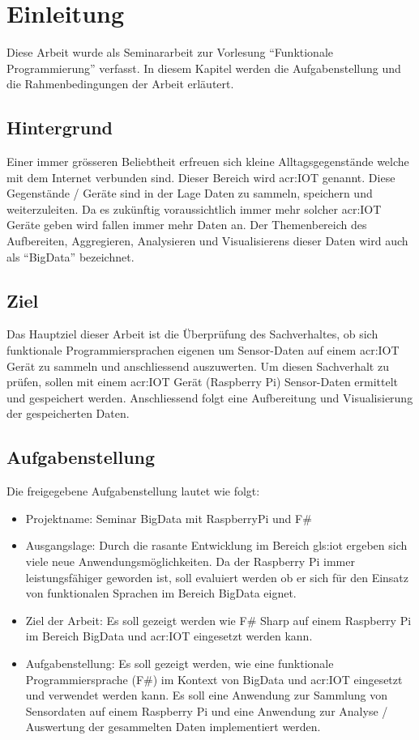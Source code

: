 
\chapter{Einleitung}
Diese Arbeit wurde als Seminararbeit zur Vorlesung "`Funktionale Programmierung"' verfasst.
In diesem Kapitel werden die Aufgabenstellung und die Rahmenbedingungen der Arbeit erläutert.


\section{Hintergrund}
Einer immer grösseren Beliebtheit erfreuen sich kleine Alltagsgegenstände welche mit dem Internet verbunden sind. Dieser Bereich wird \gls{acr:IOT} genannt. Diese Gegenstände / Geräte sind in der Lage Daten zu sammeln, speichern und weiterzuleiten. Da es zukünftig voraussichtlich immer mehr solcher \gls{acr:IOT} Geräte geben wird fallen immer mehr Daten an. Der Themenbereich des Aufbereiten, Aggregieren, Analysieren und Visualisierens dieser Daten wird auch als "`BigData"' bezeichnet.


\section{Ziel}
Das Hauptziel dieser Arbeit ist die Überprüfung des Sachverhaltes, ob sich funktionale Programmiersprachen eigenen um Sensor-Daten auf einem \gls{acr:IOT} Gerät zu sammeln und anschliessend auszuwerten. Um diesen Sachverhalt zu prüfen, sollen mit einem \gls{acr:IOT} Gerät (Raspberry Pi) Sensor-Daten ermittelt und gespeichert werden. Anschliessend folgt eine Aufbereitung und Visualisierung der gespeicherten Daten.

\section{Aufgabenstellung} \label{sec:Aufgabenstellung}
Die freigegebene Aufgabenstellung lautet wie folgt:

\begin{itemize}
\item Projektname: Seminar BigData mit RaspberryPi und F\#
\item Ausgangslage: Durch die rasante Entwicklung im Bereich \Gls{gls:iot} ergeben sich viele neue Anwendungsmöglichkeiten. Da der Raspberry Pi immer leistungsfähiger geworden ist, soll evaluiert werden ob er sich für den Einsatz von funktionalen Sprachen im Bereich BigData eignet.
\item Ziel der Arbeit: Es soll gezeigt werden wie F\# Sharp auf einem Raspberry Pi im Bereich BigData und \gls{acr:IOT} eingesetzt werden kann.
\item Aufgabenstellung: Es soll gezeigt werden, wie eine funktionale Programmiersprache (F\#) im Kontext von BigData und \gls{acr:IOT} eingesetzt und verwendet werden kann. Es soll eine Anwendung zur Sammlung von Sensordaten auf einem Raspberry Pi und eine Anwendung zur Analyse / Auswertung der gesammelten Daten implementiert werden.
\end{itemize}


